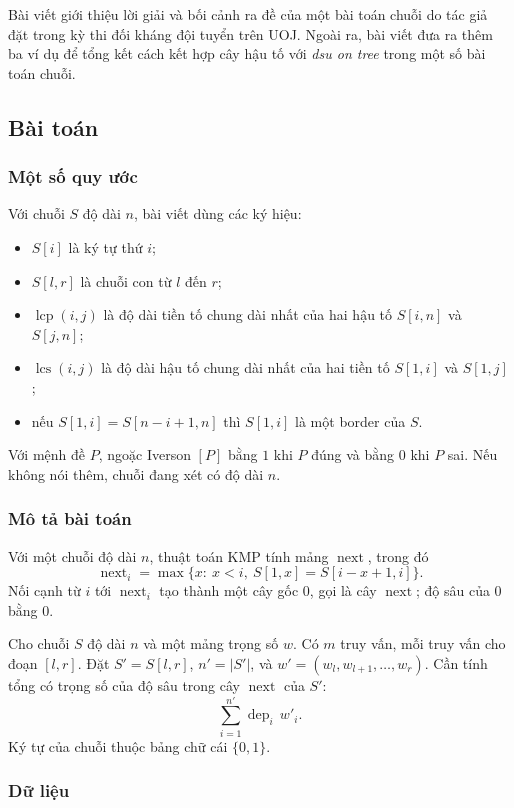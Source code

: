 \documentclass[11pt]{article}
\begin{document}
Bài viết giới thiệu lời giải và bối cảnh ra đề của một bài toán chuỗi do tác giả
đặt trong kỳ thi đối kháng đội tuyển trên UOJ. Ngoài ra, bài viết đưa ra thêm
ba ví dụ để tổng kết cách kết hợp cây hậu tố với \emph{dsu on tree} trong một
số bài toán chuỗi.

\subsection{Bài toán}

\subsubsection{Một số quy ước}

Với chuỗi $S$ độ dài $n$, bài viết dùng các ký hiệu:
\begin{itemize}
  \item $S[i]$ là ký tự thứ $i$;
  \item $S[l,r]$ là chuỗi con từ $l$ đến $r$;
  \item $\operatorname{lcp}(i,j)$ là độ dài tiền tố chung dài nhất của hai hậu
  tố $S[i,n]$ và $S[j,n]$;
  \item $\operatorname{lcs}(i,j)$ là độ dài hậu tố chung dài nhất của hai tiền
  tố $S[1,i]$ và $S[1,j]$;
  \item nếu $S[1,i]=S[n-i+1,n]$ thì $S[1,i]$ là một border của $S$.
\end{itemize}
Với mệnh đề $P$, ngoặc Iverson $[P]$ bằng $1$ khi $P$ đúng và bằng $0$ khi $P$
sai. Nếu không nói thêm, chuỗi đang xét có độ dài $n$.

\subsubsection{Mô tả bài toán}

Với một chuỗi độ dài $n$, thuật toán KMP tính mảng $\operatorname{next}$, trong
đó
\[
  \operatorname{next}_i=\max\{x:\ x<i,\ S[1,x]=S[i-x+1,i]\}.
\]
Nối cạnh từ $i$ tới $\operatorname{next}_i$ tạo thành một cây gốc $0$, gọi là
cây \(\operatorname{next}\); độ sâu của $0$ bằng $0$.

Cho chuỗi $S$ độ dài $n$ và một mảng trọng số $w$. Có \(m\) truy vấn, mỗi truy
vấn cho đoạn $[l,r]$. Đặt \(S'=S[l,r]\), \(n'=|S'|\), và
\(w'=(w_l,w_{l+1},\ldots,w_r)\). Cần tính tổng có trọng số của độ sâu trong cây
\(\operatorname{next}\) của \(S'\):
\[
  \sum_{i=1}^{n'} \operatorname{dep}_i\,w'_i.
\]
Ký tự của chuỗi thuộc bảng chữ cái \(\{0,1\}\).

\subsubsection{Dữ liệu}
\end{document}
